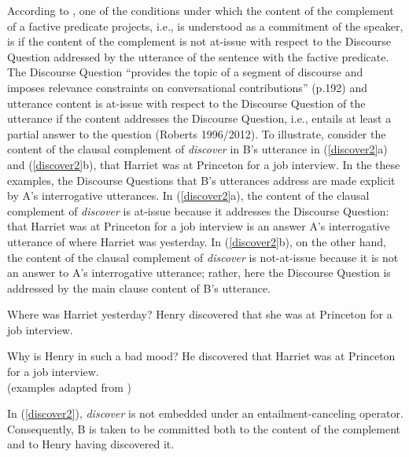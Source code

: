 \documentclass[11pt,fleqn]{article}
\newcommand{\6}{\mbox{$[\hspace*{-.6mm}[$}}
\newcommand{\9}{\mbox{$]\hspace*{-.6mm}]$}}
\begin{document}
According to \citealt{best-question}, one of the conditions under which the content of the complement of a factive predicate projects, i.e., is understood as a commitment of the speaker, is if the content of the complement is not at-issue with respect to the Discourse Question addressed by the utterance of the sentence with the factive predicate. The Discourse Question ``provides the topic of a segment of discourse and imposes relevance constraints on conversational contributions'' (p.192) and utterance content is at-issue with respect to the Discourse Question of the utterance if the content addresses the Discourse Question, i.e., entails at least a partial answer to the question (Roberts 1996/2012\nocite{roberts12}). To illustrate, consider the content of the clausal complement of {\em discover} in B's utterance in (\ref{discover2}a) and (\ref{discover2}b), that Harriet was at Princeton for a job interview. In the these examples, the Discourse Questions that B's utterances address are made explicit by A's interrogative utterances. In (\ref{discover2}a), the content of the clausal complement of {\em discover} is at-issue because it addresses the Discourse Question: that Harriet was at Princeton for a job interview is an answer A's interrogative utterance of where Harriet was yesterday. In (\ref{discover2}b), on the other hand, the content of the clausal complement of {\em discover} is not-at-issue because it is not an answer to A's interrogative utterance; rather, here the Discourse Question is addressed by the main clause content of B's utterance.


\begin{exe}
\ex\label{discover2}
\begin{xlist}
\ex
\begin{xlist}
 Where was Harriet yesterday?
 Henry discovered that she was at Princeton for a job interview.
\end{xlist}

\ex
\begin{xlist}
 Why is Henry in such a bad mood?
 He discovered that Harriet was at Princeton for a job interview.
\\ \hspace*{.2cm} \hfill (examples adapted from \citealt[1035]{simons07})
\end{xlist}

\end{xlist}
\end{exe}
In (\ref{discover2}), {\em discover} is not embedded under an entailment-canceling operator. Consequently, B is taken to be committed  both to the content of the complement and to Henry having discovered it. 
\end{document}
